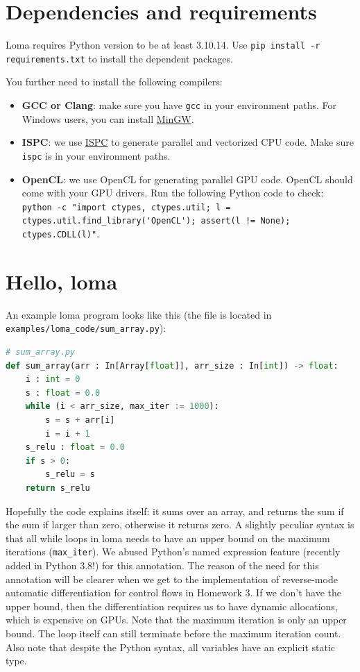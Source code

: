 \section{Dependencies and requirements}

Loma requires Python version to be at least 3.10.14. 
Use \lstinline{pip install -r requirements.txt} to install the dependent packages.

You further need to install the following compilers:
\begin{itemize}
    \item \textbf{GCC or Clang}: make sure you have \lstinline{gcc} in your environment paths. For Windows users, you can install \href{https://www.mingw-w64.org/}{MinGW}.
    \item \textbf{ISPC}: we use \href{https://ispc.github.io/}{ISPC} to generate parallel and vectorized CPU code. Make sure \lstinline{ispc} is in your environment paths.
    \item \textbf{OpenCL}: we use OpenCL for generating parallel GPU code. OpenCL should come with your GPU drivers. Run the following Python code to check: \lstinline{python -c "import ctypes, ctypes.util; l = ctypes.util.find_library('OpenCL'); assert(l != None); ctypes.CDLL(l)"}.
\end{itemize}

\section{Hello, loma}

An example loma program looks like this (the file is located in \lstinline{examples/loma_code/sum_array.py}):
\begin{lstlisting}[language=python]
# sum_array.py
def sum_array(arr : In[Array[float]], arr_size : In[int]) -> float:
    i : int = 0
    s : float = 0.0
    while (i < arr_size, max_iter := 1000):
        s = s + arr[i]
        i = i + 1
    s_relu : float = 0.0
    if s > 0:
        s_relu = s
    return s_relu
\end{lstlisting}
Hopefully the code explains itself: it sums over an array, and returns the sum if the sum if larger than zero, otherwise it returns zero. A slightly peculiar syntax is that all while loops in loma needs to have an upper bound on the maximum iterations (\lstinline{max_iter}). We abused Python's named expression feature (recently added in Python 3.8!) for this annotation. The reason of the need for this annotation will be clearer when we get to the implementation of reverse-mode automatic differentiation for control flows in Homework 3. If we don't have the upper bound, then the differentiation requires us to have dynamic allocations, which is expensive on GPUs. Note that the maximum iteration is only an upper bound. The loop itself can still terminate before the maximum iteration count. Also note that despite the Python syntax, all variables have an explicit static type.

